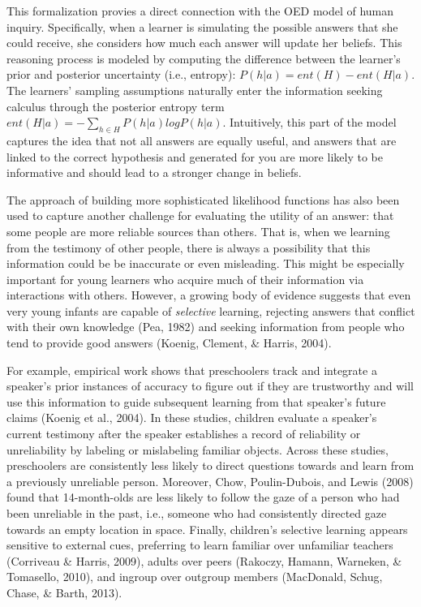 \documentclass[english,floatsintext,man]{apa6}
\theoremstyle{definition}
\theoremstyle{definition}
\theoremstyle{definition}
\theoremstyle{remark}
\begin{document}
This formalization provies a direct connection with the OED model of
human inquiry. Specifically, when a learner is simulating the possible
answers that she could receive, she considers how much each answer will
update her beliefs. This reasoning process is modeled by computing the
difference between the learner's prior and posterior uncertainty (i.e.,
entropy): \(P(h|a) = ent(H) - ent(H|a)\). The learners' sampling
assumptions naturally enter the information seeking calculus through the
posterior entropy term \(ent(H|a) = -\sum_{h\in H}{P(h|a)logP(h|a)}\).
Intuitively, this part of the model captures the idea that not all
answers are equally useful, and answers that are linked to the correct
hypothesis and generated for you are more likely to be informative and
should lead to a stronger change in beliefs.

The approach of building more sophisticated likelihood functions has
also been used to capture another challenge for evaluating the utility
of an answer: that some people are more reliable sources than others.
That is, when we learning from the testimony of other people, there is
always a possibility that this information could be be inaccurate or
even misleading. This might be especially important for young learners
who acquire much of their information via interactions with others.
However, a growing body of evidence suggests that even very young
infants are capable of \emph{selective} learning, rejecting answers that
conflict with their own knowledge (Pea, 1982) and seeking information
from people who tend to provide good answers (Koenig, Clement, \&
Harris, 2004).

For example, empirical work shows that preschoolers track and integrate
a speaker's prior instances of accuracy to figure out if they are
trustworthy and will use this information to guide subsequent learning
from that speaker's future claims (Koenig et al., 2004). In these
studies, children evaluate a speaker's current testimony after the
speaker establishes a record of reliability or unreliability by labeling
or mislabeling familiar objects. Across these studies, preschoolers are
consistently less likely to direct questions towards and learn from a
previously unreliable person. Moreover, Chow, Poulin-Dubois, and Lewis
(2008) found that 14-month-olds are less likely to follow the gaze of a
person who had been unreliable in the past, i.e., someone who had
consistently directed gaze towards an empty location in space. Finally,
children's selective learning appears sensitive to external cues,
preferring to learn familiar over unfamiliar teachers (Corriveau \&
Harris, 2009), adults over peers (Rakoczy, Hamann, Warneken, \&
Tomasello, 2010), and ingroup over outgroup members (MacDonald, Schug,
Chase, \& Barth, 2013).
\end{document}

